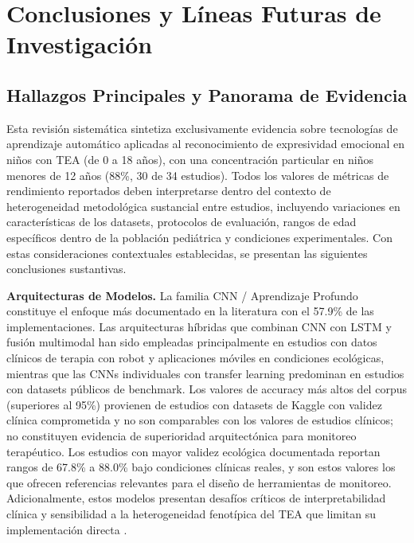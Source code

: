 \documentclass[ASNA,twocolumn]{USG}
\begin{document}
	\section{Conclusiones y Líneas Futuras de Investigación}\label{sec7}
	
	\subsection{Hallazgos Principales y Panorama de Evidencia}\label{sec7a}
	
	Esta revisión sistemática sintetiza exclusivamente evidencia sobre tecnologías de
	aprendizaje automático aplicadas al reconocimiento de expresividad emocional en
	niños con TEA (de 0 a 18 años), con una concentración particular en niños menores
	de 12 años (88\%, 30 de 34 estudios). Todos los valores de métricas de rendimiento
	reportados deben interpretarse dentro del contexto de heterogeneidad metodológica
	sustancial entre estudios, incluyendo variaciones en características de los
	datasets, protocolos de evaluación, rangos de edad específicos dentro de la
	población pediátrica y condiciones experimentales. Con estas consideraciones
	contextuales establecidas, se presentan las siguientes conclusiones sustantivas.
	
	\textbf{Arquitecturas de Modelos.} La familia CNN / Aprendizaje Profundo constituye
	el enfoque más documentado en la literatura con el 57.9\% de las implementaciones.
	Las arquitecturas híbridas que combinan CNN con LSTM y fusión multimodal han sido
	empleadas principalmente en estudios con datos clínicos de terapia con robot y
	aplicaciones móviles en condiciones ecológicas, mientras que las CNNs individuales
	con transfer learning predominan en estudios con datasets públicos de benchmark.
	Los valores de accuracy más altos del corpus (superiores al 95\%) provienen de
	estudios con datasets de Kaggle con validez clínica comprometida y no son
	comparables con los valores de estudios clínicos; no constituyen evidencia de
	superioridad arquitectónica para monitoreo terapéutico. Los estudios con mayor
	validez ecológica documentada reportan rangos de 67.8\% a 88.0\% bajo condiciones
	clínicas reales, y son estos valores los que ofrecen referencias relevantes para
	el diseño de herramientas de monitoreo. Adicionalmente, estos modelos presentan
	desafíos críticos de interpretabilidad clínica y sensibilidad a la heterogeneidad
	fenotípica del TEA que limitan su implementación directa
	\cite{Hassan2025,Rudovic2019}.
	
\end{document}
